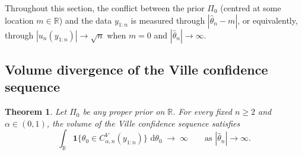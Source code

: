 \documentclass[numsec,webpdf,modern,medium,namedate]{oup-authoring-template}
\theoremstyle{thmstyleone}%
\newtheorem{theorem}{Theorem}%
\theoremstyle{thmstyletwo}%
\theoremstyle{thmstylethree}%
\newcommand{\dd}{\,\mathrm{d}}
\newcommand{\one}{\boldsymbol{1}}
\newcommand{\1}{\mathbf{1}}
\begin{document}
Throughout this section, the conflict between the prior \(\Pi_0\) (centred at some location \(m\in\mathbb{R}\)) and the data \(y_{1:n}\) is measured through \(|\widehat\theta_n-m|\), or equivalently, through \(|u_n(y_{1:n})|\to\sqrt n\) when \(m=0\) and \(|\widehat\theta_n|\to
\infty\).

\subsection{Volume divergence of the Ville confidence sequence}
\label{sec:Ville-divergence}

\begin{theorem}\label{thm:CSVille-divergence}
Let \(\Pi_0\) be any proper prior on \(\mathbb{R}\). For every fixed \(n\geq 2\) and \(\alpha\in(0,1)\), the volume of the Ville confidence sequence satisfies
\[
   \int_\mathbb{R} \one\{\theta_0\in C^V_{\alpha,n}(y_{1:n})\}\,\dd\theta_0
   \;\longrightarrow\;\infty
   \qquad\text{as }|\widehat\theta_n|\to\infty.
\]
\end{theorem}
\end{document}
